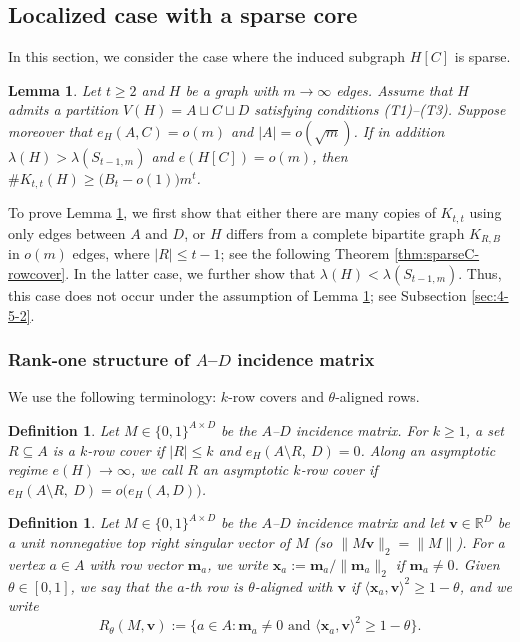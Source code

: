 \documentclass[10pt,a4paper]{amsart}
\newtheorem{lemma}[theorem]{Lemma}
\newtheorem{definition}[theorem]{Definition}
\newcommand{\Ktt}{K_{t,t}}
\begin{document}
\subsection{Localized case with a sparse core}

In this section, 
we consider the case where the induced subgraph $H[C]$ is sparse. 

\begin{lemma} \label{lem:lemmaD-localized-sparse} 
Let \(t\ge2\) and $H$ be a graph with $m\to \infty$ edges. 
Assume that $H$ admits a partition $V(H)=A\sqcup C\sqcup D$ satisfying conditions
\textup{(T1)}--\textup{(T3)}. Suppose moreover that
 $e_H(A,C)=o(m)$ and $|A|=o(\sqrt{m})$. 
 If in addition $\lambda(H)>\lambda(S_{t-1,m})$ and $e(H[C])=o(m)$,  then $\texttt{\#}\Ktt(H)\ge \bigl(B_t-o(1)\bigr) m^t$.
\end{lemma}

To prove Lemma \ref{lem:lemmaD-localized-sparse}, we first show that either there are many copies of $K_{t,t}$ using only edges between $A$ and $D$, or $H$ differs from a complete bipartite graph $K_{R,B}$ in $o(m)$ edges, where $|R|\le t-1$; see the following Theorem \ref{thm:sparseC-rowcover}.  
In the latter case, we further show that 
$\lambda (H)< \lambda (S_{t-1,m})$. Thus, this case does not occur under the assumption of Lemma \ref{lem:lemmaD-localized-sparse}; see Subsection \ref{sec:4-5-2}.   

\subsubsection{Rank-one structure of $A$--$D$ incidence matrix}

\label{sec:4-5-1}

We use the following terminology: \(k\)-row covers and \(\theta\)-aligned rows.

\begin{definition} \label{def:row-cover}
Let $M\in\{0,1\}^{A\times D}$ be the $A$--$D$ incidence matrix.
For $k\ge 1$, a set $R\subseteq A$ is a \emph{$k$-row cover} if $|R|\le k$ and $e_H(A\setminus R,\ D)=0$.
Along an asymptotic regime $e(H)\to\infty$, we call $R$ an \emph{asymptotic $k$-row cover} if
$e_H(A\setminus R,\ D)=o\bigl(e_H(A,D)\bigr)$.
\end{definition}

\begin{definition} \label{def:aligned-rows}
Let $M\in\{0,1\}^{A\times D}$ be the $A$--$D$ incidence matrix and let $\bm{v}\in\mathbb R^D$ be a unit nonnegative top right singular vector of $M$
(so $\|M \bm{v}\|_2=\|M\|$).
For a vertex $a\in A$ with row vector $\bm{m}_a$, we write $\bm{x}_a:=\bm{m}_a/\|\bm{m}_a\|_2$ if $\bm{m}_a\neq 0$.
Given $\theta\in[0,1]$, we say that the $a$-th row is \emph{$\theta$-aligned} with $\bm{v}$ if $\langle \bm{x}_a,\bm{v}\rangle^2\ge 1-\theta$, and we write
\[
 R_\theta(M,\bm{v}) 
 :=
 \big\{a\in A: \bm{m}_a\neq 0\text{ and }\langle \bm{x}_a,\bm{v}\rangle^2\ge 1-\theta \big\}.
\]
\end{definition}
\end{document}
